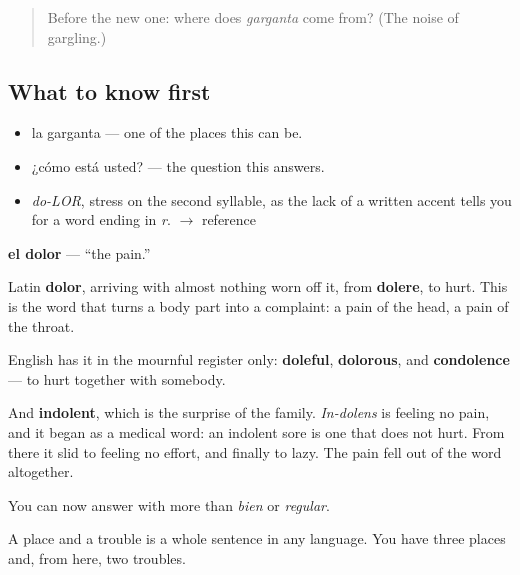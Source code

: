 \label{lesson:ES-C286-dolor}



\begin{quote}
Before the new one: where does \emph{garganta} come from? (The noise of gargling.)
\end{quote}

\subsection*{What to know first}
\begin{itemize}
\raggedright
  \item la garganta — one of the places this can be.
  \item ¿cómo está usted? — the question this answers.
\end{itemize}

\begin{sounds}
\begin{itemize}
\raggedright
  \item \emph{do-LOR}, stress on the second syllable, as the lack of a written accent tells you for a word ending in \emph{r}. $\to$ reference
\end{itemize}
\end{sounds}

\begin{cousinweb}
\textbf{el dolor} — \textquotedblleft{}the pain.\textquotedblright{}

Latin \textbf{dolor}, arriving with almost nothing worn off it, from \textbf{dolere}, to hurt. This is the word that turns a body part into a complaint: a pain of the head, a pain of the throat.

English has it in the mournful register only: \textbf{doleful}, \textbf{dolorous}, and \textbf{condolence} — to hurt together with somebody.

And \textbf{indolent}, which is the surprise of the family. \emph{In-dolens} is feeling no pain, and it began as a medical word: an indolent sore is one that does not hurt. From there it slid to feeling no effort, and finally to lazy. The pain fell out of the word altogether.
\end{cousinweb}

\begin{grammarlens}[title={What you've built}]
You can now answer with more than \emph{bien} or \emph{regular}.

A place and a trouble is a whole sentence in any language. You have three places and, from here, two troubles.
\end{grammarlens}

